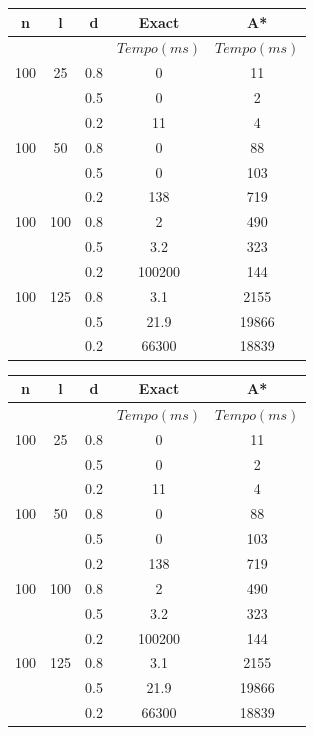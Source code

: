 \documentclass[12pt]{article}
\begin{document}
		\vspace{2cm}

		\begin{tabular}{c|c|c|c|c} \hline
			n & l & d & Exact & A* \\ \hline
			& & & $Tempo(ms)$ & $Tempo(ms)$\\ \hline
			100 & 25  & 0.8 &  0 & 11\\
			   &      & 0.5 &  0 & 2\\
			   &      & 0.2 & 11 & 4\\ \hline
			100 & 50  & 0.8 &  0 & 88 \\
			   &      & 0.5 &  0 & 103\\
			   &      & 0.2 & 138 & 719\\ \hline
			100 & 100 & 0.8 &  2 & 490\\
			   &      & 0.5 & 3.2 & 323\\
			   &      & 0.2 & 100200 & 144\\ \hline
			100 & 125 & 0.8 & 3.1 & 2155\\
			   &      & 0.5 & 21.9 & 19866\\
			   &      & 0.2 & 66300 & 18839\\ \hline
		\end{tabular}


		\vspace{2cm}

		\begin{tabular}{c|c|c|c|c} \hline
			n & l & d & Exact & A* \\ \hline
			& & & $Tempo(ms)$ & $Tempo(ms)$\\ \hline
			100 & 25  & 0.8 &  0 & 11\\
			   &      & 0.5 &  0 & 2\\
			   &      & 0.2 & 11 & 4\\ \hline
			100 & 50  & 0.8 &  0 & 88 \\
			   &      & 0.5 &  0 & 103\\
			   &      & 0.2 & 138 & 719\\ \hline
			100 & 100 & 0.8 &  2 & 490\\
			   &      & 0.5 & 3.2 & 323\\
			   &      & 0.2 & 100200 & 144\\ \hline
			100 & 125 & 0.8 & 3.1 & 2155\\
			   &      & 0.5 & 21.9 & 19866\\
			   &      & 0.2 & 66300 & 18839\\ \hline
		\end{tabular}
\end{document}
